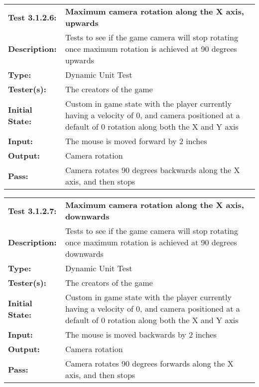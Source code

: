 \documentclass[12pt, titlepage]{article}
\begin{document}
\begin{mdframed}[linewidth=1pt]
\begin{tabularx}{\textwidth}{@{}p{3cm}X@{}}
{\bf Test 3.1.2.6:} & {\bf Maximum camera rotation along the X axis, upwards}\\[\baselineskip]
{\bf Description:} & Tests to see if the game camera will stop rotating once maximum rotation is achieved at 90 degrees upwards\\[0.5\baselineskip]
{\bf Type:} & Dynamic Unit Test\\[0.5\baselineskip]
{\bf Tester(s):} & The creators of the game\\[0.5\baselineskip]
{\bf Initial State:} & Custom in game state with the player currently having a velocity of 0, and camera positioned at a default of 0 rotation along both the X and Y axis\\[0.5\baselineskip]
{\bf Input:} & The mouse is moved forward by 2 inches\\[0.5\baselineskip]
{\bf Output:} & Camera rotation\\[0.5\baselineskip]
{\bf Pass:} & Camera rotates 90 degrees backwards along the X axis, and then stops
\end{tabularx}
\end{mdframed}

\begin{mdframed}[linewidth=1pt]
\begin{tabularx}{\textwidth}{@{}p{3cm}X@{}}
{\bf Test 3.1.2.7:} & {\bf Maximum camera rotation along the X axis, downwards}\\[\baselineskip]
{\bf Description:} & Tests to see if the game camera will stop rotating once maximum rotation is achieved at 90 degrees downwards\\[0.5\baselineskip]
{\bf Type:} & Dynamic Unit Test\\[0.5\baselineskip]
{\bf Tester(s):} & The creators of the game\\[0.5\baselineskip]
{\bf Initial State:} & Custom in game state with the player currently having a velocity of 0, and camera positioned at a default of 0 rotation along both the X and Y axis\\[0.5\baselineskip]
{\bf Input:} & The mouse is moved backwards by 2 inches\\[0.5\baselineskip]
{\bf Output:} & Camera rotation\\[0.5\baselineskip]
{\bf Pass:} & Camera rotates 90 degrees forwards along the X axis, and then stops
\end{tabularx}
\end{mdframed}
\end{document}
